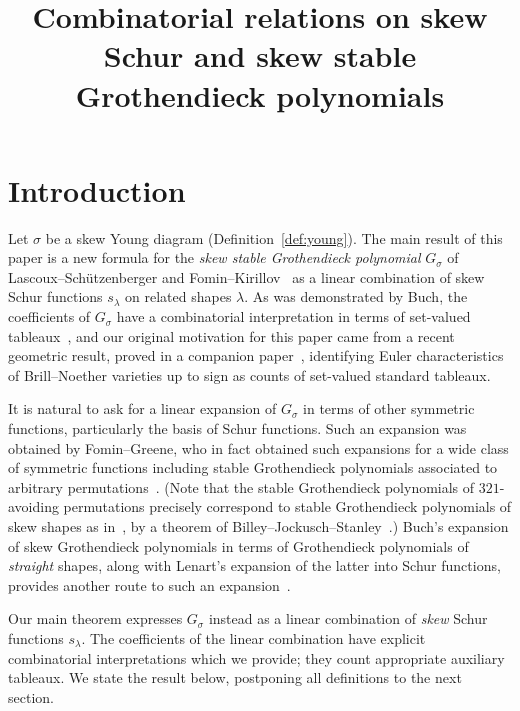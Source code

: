 \documentclass[ALCO,ThmDefs,Unicode,epreuves]{cedram}
\author{\firstname{Melody} \lastname{Chan}}
\author{\firstname{Nathan} \lastname{Pflueger}}
\title[Combinatorial relations]
{Combinatorial relations on skew Schur and skew stable Grothendieck polynomials}
\begin{document}
\maketitle

\section{Introduction}

\noindent 
Let $\sigma$ be a skew Young diagram (Definition~\ref{def:young}).
The main result of this paper is a new formula for the \emph{skew stable Grothendieck polynomial} $G_\sigma$ of Lascoux--Sch{\"u}tzenberger and Fomin--Kirillov~\cite{fomin-kirillov-grothendieck,lascoux-schutzenberger} as a linear combination of skew Schur functions $s_\lambda$ on related shapes $\lambda$. As was demonstrated by Buch, the coefficients of $G_\sigma$ have a combinatorial interpretation in terms of set-valued tableaux~\cite{buch-littlewood-richardson}, and
our original motivation for this paper came from a recent geometric result, proved in a companion paper~\cite{chan-pflueger-euler}, identifying Euler characteristics of Brill--Noether varieties up to sign as counts of set-valued standard tableaux. 

It is natural to ask for a linear expansion of $G_\sigma$ in terms of other symmetric functions, particularly the basis of Schur functions. 
Such an expansion was obtained by Fomin--Greene, who in fact obtained such expansions for a wide class of symmetric functions including stable Grothendieck polynomials associated to arbitrary permutations~\cite{fomin-greene-noncommutative}. (Note that the stable Grothendieck polynomials of $321$-avoiding permutations precisely correspond to stable Grothendieck polynomials of skew shapes as in~\cite{buch-littlewood-richardson}, by a theorem of Billey--Jockusch--Stanley~\cite{billey-jockusch-stanley-some}.) Buch's expansion of skew Grothendieck polynomials in terms of Grothendieck polynomials of \emph{straight} shapes, along with Lenart's expansion of the latter into Schur functions, provides another route to such an expansion~\cite{buch-littlewood-richardson,lenart-combinatorial}. 

Our main theorem expresses $G_\sigma$ instead as a linear combination of \emph{skew} Schur functions $s_\lambda$. 
The coefficients of the linear combination have explicit combinatorial interpretations which we provide; they count appropriate auxiliary tableaux. We state the result below, postponing all definitions to the next section.
\end{document}
